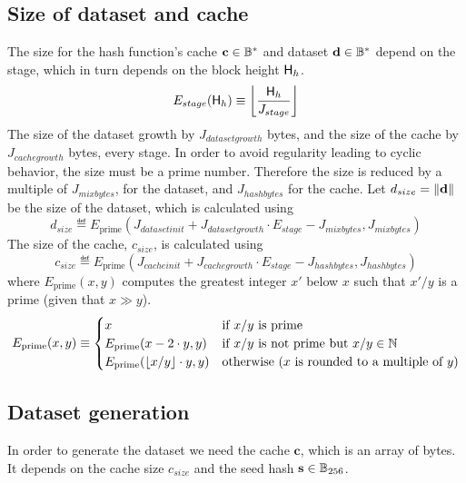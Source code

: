 \subsection{Size of dataset and cache}
The size for the hash function's cache $\mathbf{c} \in \mathbb{B}^*$  and dataset $\mathbf{d} \in \mathbb{B}^*$ depend on the stage, which in turn depends on the block height $\textsf{H}_{h}$.
\begin{equation}
 E_{stage}(\textsf{H}_{h}) \equiv \left\lfloor\frac{\textsf{H}_{h}}{J_{stage}}\right\rfloor
\end{equation}
The size of the dataset growth by $J_{datasetgrowth}$ bytes, and the size of the cache by $J_{cachegrowth}$ bytes, every stage. In order to avoid regularity leading to cyclic behavior, the size must be a prime number. Therefore the size is reduced by a multiple of $J_{mixbytes}$, for the dataset, and $J_{hashbytes}$ for the cache.
Let $d_{size} = \lVert\mathbf{d} \rVert$ be the size of the dataset, 
which is calculated using
\begin{equation}
 d_{size} \eqdef E_{\mathrm{prime}}(J_{datasetinit} + J_{datasetgrowth} \cdot E_{stage} - J_{mixbytes}, J_{mixbytes})
\end{equation}
The size of the cache, $c_{size}$, is calculated using
\begin{equation}
 c_{size} \eqdef E_{\mathrm{prime}}(J_{cacheinit} + J_{cachegrowth} \cdot E_{stage} - J_{hashbytes}, J_{hashbytes})
\end{equation}
where $E_{\mathrm{prime}}(x, y)$ computes the greatest integer $x'$ below $x$ such that $x'/y$ is a prime (given that $x\gg y$).
\begin{equation}
	E_{\mathrm{prime}}(x, y) \equiv 
	\begin{cases}
		x & \text{if $x / y$ is prime} \\
		E_{\mathrm{prime}}(x - 2 \cdot y, y) & \text{if $x / y$ is not prime but $x / y \in \mathbb{N}$} \\
		E_{\mathrm{prime}}(\lfloor x/y \rfloor\cdot y, y) & \text{otherwise ($x$ is rounded to a multiple of $y$)}
	\end{cases}
\end{equation}
\subsection{Dataset generation}
In order to generate the dataset we need the cache $\mathbf{c}$, which is an array of bytes. It depends on the cache size  $c_{size}$ and the seed hash $\mathbf{s} \in \mathbb{B}_{256}$.
